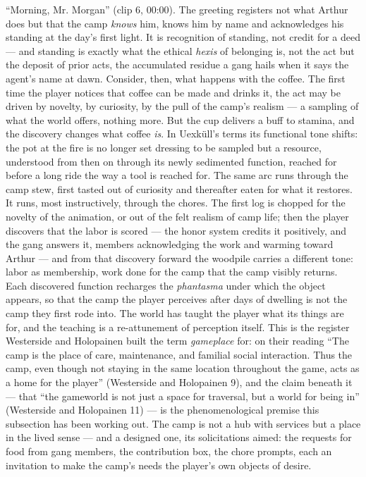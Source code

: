 \documentclass{article}
\begin{document}
``Morning, Mr. Morgan'' (clip 6, 00:00). The greeting registers not what Arthur does but that the camp \textit{knows} him, knows him by name and acknowledges his standing at the day's first light. It is recognition of standing, not credit for a deed — and standing is exactly what the ethical \textit{hexis} of belonging is, not the act but the deposit of prior acts, the accumulated residue a gang hails when it says the agent's name at dawn. Consider, then, what happens with the coffee. The first time the player notices that coffee can be made and drinks it, the act may be driven by novelty, by curiosity, by the pull of the camp's realism — a sampling of what the world offers, nothing more. But the cup delivers a buff to stamina, and the discovery changes what coffee \textit{is}. In Uexküll's terms its functional tone shifts: the pot at the fire is no longer set dressing to be sampled but a resource, understood from then on through its newly sedimented function, reached for before a long ride the way a tool is reached for. The same arc runs through the camp stew, first tasted out of curiosity and thereafter eaten for what it restores. It runs, most instructively, through the chores. The first log is chopped for the novelty of the animation, or out of the felt realism of camp life; then the player discovers that the labor is scored — the honor system credits it positively, and the gang answers it, members acknowledging the work and warming toward Arthur — and from that discovery forward the woodpile carries a different tone: labor as membership, work done for the camp that the camp visibly returns. Each discovered function recharges the \textit{phantasma} under which the object appears, so that the camp the player perceives after days of dwelling is not the camp they first rode into. The world has taught the player what its things are for, and the teaching is a re-attunement of perception itself.
This is the register Westerside and Holopainen built the term \textit{gameplace} for: on their reading ``The camp is the place of care, maintenance, and familial social interaction. Thus the camp, even though not staying in the same location throughout the game, acts as a home for the player'' (Westerside and Holopainen 9), and the claim beneath it — that ``the gameworld is not just a space for traversal, but a world for being in'' (Westerside and Holopainen 11) — is the phenomenological premise this subsection has been working out. The camp is not a hub with services but a place in the lived sense — and a designed one, its solicitations aimed: the requests for food from gang members, the contribution box, the chore prompts, each an invitation to make the camp's needs the player's own objects of desire.
\end{document}

